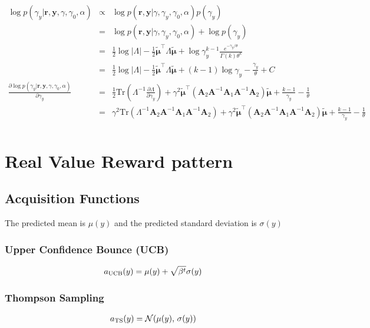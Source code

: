 \documentclass[platex, a4paper]{jsarticle}
\begin{document}
\begin{eqnarray}
  \log p(\gamma_y | \bm{r}, \bm{y},\gamma, \gamma_0, \alpha)
      &\propto& \log p( \bm{r}, \bm{y} | \gamma, \gamma_y, \gamma_0, \alpha)p(\gamma_y) \\
      &=& \log p( \bm{r}, \bm{y} | \gamma, \gamma_y, \gamma_0, \alpha) + \log p(\gamma_y) \\
      &=& \frac{1}{2} \log|\Lambda| - \frac{1}{2} \tilde{\bm{\mu}}^\top \Lambda \tilde{\bm{\mu}}
        + \log \gamma_y^{k-1} \frac{e^{-\gamma_y/\theta}}{\Gamma(k) \theta^k} \\
      &=& \frac{1}{2} \log|\Lambda| - \frac{1}{2} \tilde{\bm{\mu}}^\top \Lambda \tilde{\bm{\mu}}
        + (k-1)\log \gamma_y -  \frac{\gamma_y}{\theta} + C \\
  \frac{\partial \log p(\gamma_y | \bm{r}, \bm{y}, \gamma, \gamma_0, \alpha)}{\partial \gamma_y}
      &=& \frac{1}{2} \mathrm{Tr}( \Lambda^{-1} \frac{\partial \Lambda}{\partial \gamma_y})
        + \gamma^2   \tilde{\bm{\mu}}^\top \left(\bm{A}_2 \bm{A}^{-1} \bm{A}_1 \bm{A}^{-1} \bm{A}_2  \right)  \tilde{\bm{\mu}}
        + \frac{k-1}{\gamma_y} - \frac{1}{\theta} \\
      &=& \gamma^2 \mathrm{Tr}( \Lambda^{-1} \bm{A}_2 \bm{A}^{-1} \bm{A}_1 \bm{A}^{-1} \bm{A}_2)
        + \gamma^2  \tilde{\bm{\mu}}^\top \left(\bm{A}_2 \bm{A}^{-1} \bm{A}_1 \bm{A}^{-1} \bm{A}_2  \right)  \tilde{\bm{\mu}}
        + \frac{k-1}{\gamma_y} - \frac{1}{\theta} \\
\end{eqnarray}




\section{Real Value Reward pattern}
\subsection{Acquisition Functions}
The predicted mean is $\mu(y)$ and the predicted standard deviation is $\sigma(y)$

\subsubsection{Upper Confidence Bounce (UCB)}
\begin{eqnarray}
a_{\rm UCB}(y) = \mu(y) + \sqrt{\beta^t} \sigma(y)
\end{eqnarray}

\subsubsection{Thompson Sampling}
\begin{eqnarray}
a_{\rm TS}(y) = \mathcal{N}(\mu(y),\,\sigma(y))
\end{eqnarray}
\end{document}
